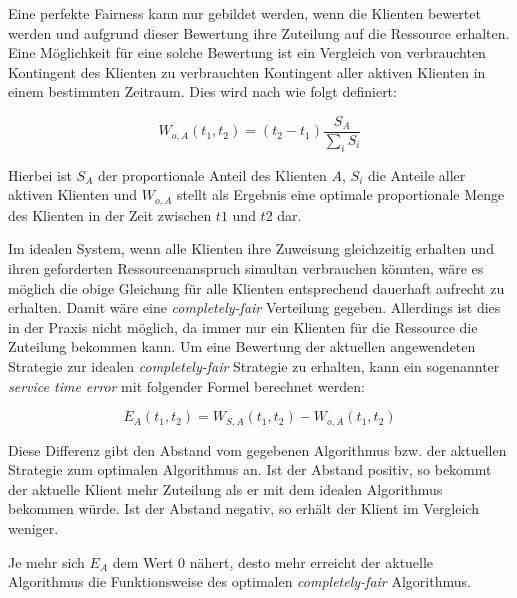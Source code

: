 Eine perfekte Fairness kann nur gebildet werden, wenn die Klienten bewertet werden und aufgrund dieser Bewertung ihre Zuteilung auf die Ressource erhalten.
Eine Möglich\-keit für eine solche Bewertung ist ein Vergleich von verbrauchten Kontingent des Klienten zu verbrauchten Kontingent aller aktiven Klienten in einem bestimmten Zeitraum. 
Dies wird nach \cite{usenix} wie folgt definiert:

\begin{equation}
W_{o,A}(t_1,t_2) = (t_2-t_1) \frac{S_A}{\sum_i S_i}
\label{eq:perfect_fairness}
\end{equation}

Hierbei ist $S_A$ der proportionale Anteil des Klienten $A$, $S_i$ die Anteile aller aktiven Klienten und $W_{o,A}$ stellt als Ergebnis eine optimale proportionale Menge des Klienten in der Zeit zwischen $t1$ und $t2$ dar.

Im idealen System, wenn alle Klienten ihre Zuweisung gleichzeitig erhalten und ihren geforderten Ressourcenanspruch simultan verbrauchen könnten, wäre es möglich die obige Gleichung für alle Klienten entsprechend dauerhaft aufrecht zu erhalten.
Damit wäre eine \textit{completely-fair} Verteilung gegeben. Allerdings ist dies in der Praxis nicht möglich, da immer nur ein Klienten für die Ressource die Zuteilung bekommen kann.
Um eine Bewertung der aktuellen angewendeten Strategie zur idealen \textit{completely-fair} Strategie zu erhalten, kann ein sogenannter \textit{service time error} mit folgender Formel berechnet werden:

\begin{equation}
E_A(t_1,t_2) = W_{S,A}(t_1,t_2)-W_{o,A}(t_1,t_2)
\label{eq:error_fairness}
\end{equation}

Diese Differenz gibt den Abstand vom gegebenen Algorithmus bzw. der aktuellen Strategie zum optimalen Algorithmus an.
Ist der Abstand positiv, so bekommt der aktuelle Klient mehr Zuteilung als er mit dem idealen Algorithmus bekommen würde. Ist der Abstand negativ, so erhält der Klient im Vergleich weniger.

Je mehr sich $E_A$ dem Wert 0 nähert, desto mehr erreicht der aktuelle Algorithmus die Funktionsweise des optimalen \textit{completely-fair} Algorithmus.
 



